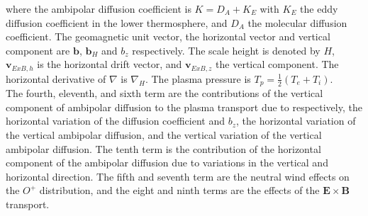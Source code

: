 %
where the ambipolar diffusion coefficient is $K = D_A + K_E$ with
$K_E$ the eddy diffusion coefficient in the lower thermosphere, and
$D_A$ the molecular diffusion coefficient. The geomagnetic unit
vector, the horizontal vector and vertical component are
$\mathbf{b}$, $\mathbf{b}_H$ and $b_z$ respectively. The scale
height is denoted by $H$, $ \mathbf{v}_{ExB,h}$ is the horizontal
drift vector, and $\mathbf{v}_{ExB,z}$ the vertical component. The
horizontal derivative of $\nabla$ is $\nabla_H$. The plasma
pressure is $T_p = \frac{1}{2}(T_e + T_i)$. \\
%
The fourth, eleventh, and sixth term are the contributions of the
vertical component of ambipolar diffusion to the plasma transport
due to respectively, the horizontal variation of the diffusion
coefficient and $b_z$, the horizontal variation of the vertical
ambipolar diffusion, and the vertical variation of the vertical
ambipolar diffusion. The tenth term is the contribution of the
horizontal component of the ambipolar diffusion due to variations in
the vertical and horizontal direction. The fifth and seventh term
are the neutral wind effects on the $O^+$ distribution, and the
eight and ninth terms are the effects of the $\mathbf{E} \times
\mathbf{B}$ transport. \\

